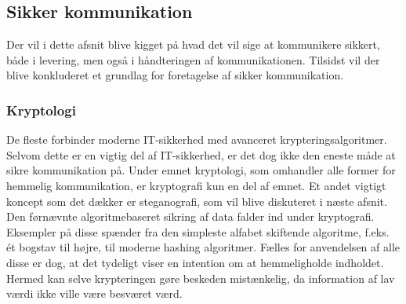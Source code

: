 \subsection{Sikker kommunikation}
Der vil i dette afsnit blive kigget på hvad det vil sige at kommunikere sikkert, både i levering, men også i håndteringen af kommunikationen. Tilsidst vil der blive konkluderet et grundlag for foretagelse af sikker kommunikation.

\subsubsection{Kryptologi}
De fleste forbinder moderne IT-sikkerhed med avanceret krypteringsalgoritmer. Selvom dette er en vigtig del af IT-sikkerhed, er det dog ikke den eneste måde at sikre kommunikation på. Under emnet kryptologi, som omhandler alle former for hemmelig kommunikation, er kryptografi kun en del af emnet. Et andet vigtigt koncept som det dækker er steganografi, som vil blive diskuteret i næste afsnit. Den førnævnte algoritmebaseret sikring af data falder ind under kryptografi. Eksempler på disse spænder fra den simpleste alfabet skiftende algoritme, f.eks. ét bogstav til højre, til moderne hashing algoritmer. Fælles for anvendelsen af alle disse er dog, at det tydeligt viser en intention om at hemmeligholde indholdet. Hermed kan selve krypteringen gøre beskeden mistænkelig, da information af lav værdi ikke ville være besværet værd.

